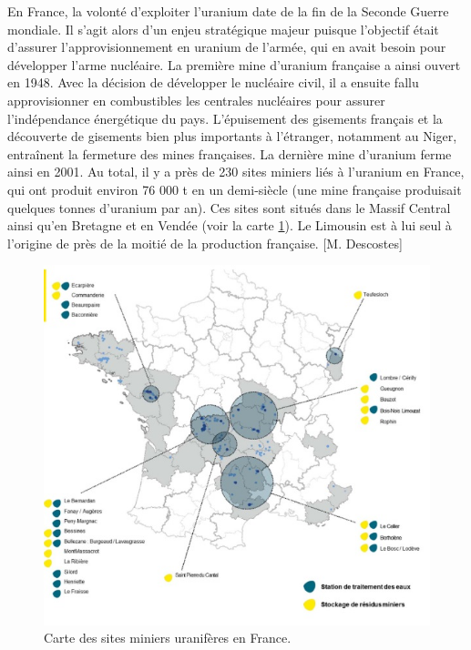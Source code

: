 \documentclass{article}
\begin{document}
En France, la volonté d’exploiter l’uranium date de la fin de la Seconde Guerre mondiale. Il s’agit alors d’un enjeu stratégique majeur puisque l’objectif était d’assurer l’approvisionnement en uranium de l’armée, qui en avait besoin pour développer l’arme nucléaire. La première mine d’uranium française a ainsi ouvert en 1948. Avec la décision de développer le nucléaire civil, il a ensuite fallu approvisionner en combustibles les centrales nucléaires pour assurer l’indépendance énergétique du pays. L’épuisement des gisements français et la découverte de gisements bien plus importants à l’étranger, notamment au Niger, entraînent la fermeture des mines françaises. La dernière mine d’uranium ferme ainsi en 2001. Au total, il y a près de 230 sites miniers liés à l’uranium en France, qui ont produit environ 76 000 t en un demi-siècle (une mine française produisait quelques tonnes d’uranium par an). Ces sites sont situés dans le Massif Central ainsi qu’en Bretagne et en Vendée (voir la carte \ref{fig:sites_orano}). Le Limousin est à lui seul à l’origine de près de la moitié de la production française. [M. Descostes]

\begin{figure}[!h]
    \centering
    \includegraphics[width=\linewidth]{I_A_2.jpg}
    \caption{Carte des sites miniers uranifères en France.}
    \label{fig:sites_orano}
\end{figure}
\end{document}
